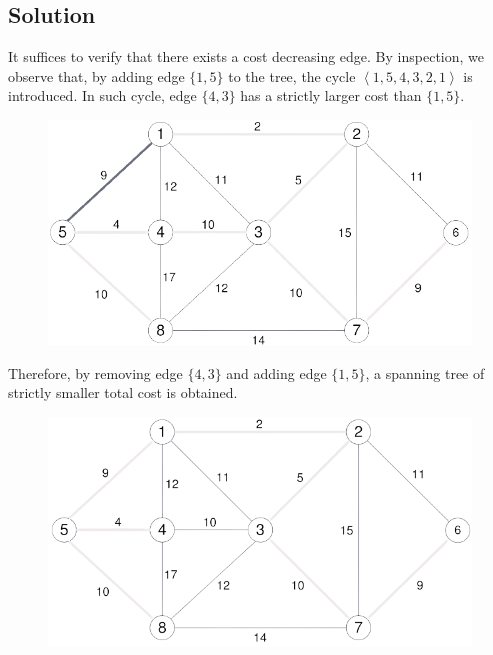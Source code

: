 \documentclass[12pt, a4paper]{report}
\newtheorem[style=M,bodystyle=\normalfont]{theorem}{Theorem}
\newtheorem[style=M,bodystyle=\normalfont]{corollary}{Corollary}
\newtheorem[style=M,bodystyle=\normalfont]{lemma}{Lemma}
\newtheorem[style=M,bodystyle=\normalfont]{definition}{Definition}
\begin{document}
    \subsection*{Solution}
        It suffices to verify that there exists a cost decreasing edge. By inspection, we observe that, by adding edge $\{1,5\}$ to the tree, the cycle 
        $\left\langle 1,5,4,3,2,1\right\rangle$ is introduced. In such cycle, edge $\{4,3\}$ has a strictly larger cost than $\{1,5\}$. 
        \begin{figure}[H]
            \centering
            \includegraphics[width=0.5\linewidth]{images/optimality1.png}
        \end{figure}
        Therefore, by removing edge $\{4,3\}$ and adding edge $\{1,5\}$, a spanning tree of strictly smaller total cost is obtained. 
        \begin{figure}[H]
            \centering
            \includegraphics[width=0.5\linewidth]{images/optimality2.png}
        \end{figure}

    \newpage
\end{document}
